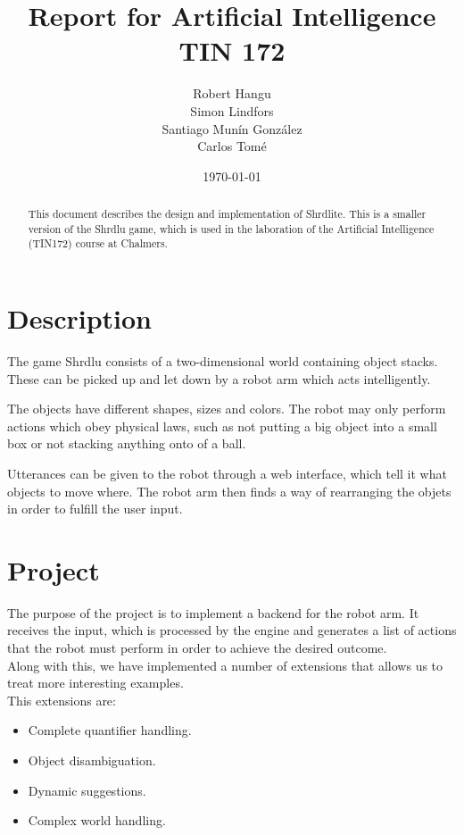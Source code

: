 \documentclass[11pt]{article}
\title{Report for Artificial Intelligence TIN 172}
\author{Robert Hangu\\\And
  Simon Lindfors\\\And
  Santiago Munín González\\\And
  Carlos Tomé
   }
\date{\today}
\begin{document}
	\maketitle
	\begin{abstract}

		This document describes the design and implementation of Shrdlite. This 
		is a smaller version of the Shrdlu game, which is used in the 
		laboration of the Artificial Intelligence (TIN172) course at Chalmers.

	\end{abstract}

	\section{Description}
	
	The game Shrdlu consists of a two-dimensional world containing object 
	stacks. These can be picked up and let down by a robot arm which acts 
	intelligently. 

	The objects have different shapes, sizes and colors. The robot may only 
	perform actions which obey physical laws, such as not putting a big object 
	into a small box or not stacking anything onto of a ball.

	Utterances can be given to the robot through a web interface, which tell it 
	what objects to move where. The robot arm then finds a way of rearranging 
	the objets in order to fulfill the user input.

	\section{Project}

	The purpose of the project is to implement a backend for the robot 
	arm. It receives the input, which is processed by the engine and 
	generates a list of actions that the robot must perform in order to achieve 
	the desired outcome. \\
	
        Along with this, we have implemented a number of extensions that 
        allows us to treat more interesting examples.  \\

        This extensions are: \\

        \begin{itemize}
          \item Complete quantifier handling.  \\

          \item Object disambiguation. \\ 

          \item Dynamic suggestions.  \\

          \item Complex world handling.  \\

        \end{itemize}
\end{document}
